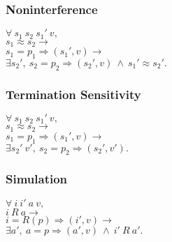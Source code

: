 \subsubsection*{Noninterference}

$\forall\ s_1\ s_2\ s_1'\ v,$\\
$s_1\approx s_2 \rightarrow$\\
$s_1 =p_1\Rightarrow (s_1', v) \rightarrow$\\
$\exists s_2',\ s_2 =p_2\Rightarrow (s_2', v)\ \wedge\ s_1'\approx s_2'.$

\subsubsection*{Termination Sensitivity}

$\forall\ s_1\ s_2\ s_1'\ v,$\\
$s_1\approx s_2 \rightarrow$\\
$s_1 =p_1\Rightarrow (s_1', v) \rightarrow$\\
$\exists s_2'\ v',\ s_2 =p_2\Rightarrow (s_2', v').$

\subsubsection*{Simulation}

$\forall\ i\ i'\ a\ v,$\\
$i\ R\ a \rightarrow$\\
$i =R(p)\Rightarrow (i', v) \rightarrow$\\
$\exists a',\ a =p\Rightarrow (a', v)\ \wedge\ i'\ R\ a'.$

